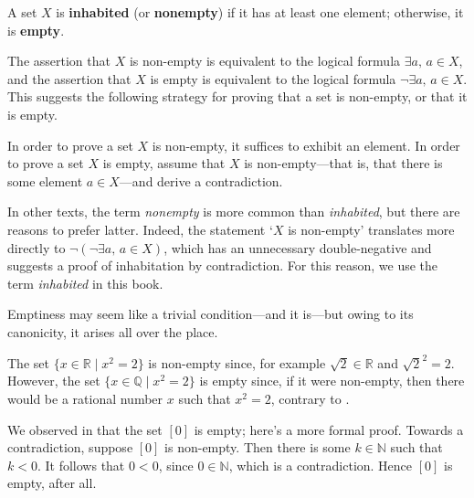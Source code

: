 \begin{definition}
\label{defInhabited}
\label{defEmptyProperty}
A set $X$ is \textbf{inhabited} (or \textbf{nonempty}) if it has at least one element; otherwise, it is \textbf{empty}.
\end{definition}

The assertion that $X$ is non-empty is equivalent to the logical formula $\exists a,\, a \in X$, and the assertion that $X$ is empty is equivalent to the logical formula $\neg \exists a,\, a \in X$. This suggests the following strategy for proving that a set is non-empty, or that it is empty.

\begin{strategy}
In order to prove a set $X$ is non-empty, it suffices to exhibit an element. In order to prove a set $X$ is empty, assume that $X$ is non-empty---that is, that there is some element $a \in X$---and derive a contradiction.
\end{strategy}

In other texts, the term \textit{nonempty} is more common than \textit{inhabited}, but there are reasons to prefer latter. Indeed, the statement `$X$ is non-empty' translates more directly to $\neg(\neg \exists a,\, a \in X)$, which has an unnecessary double-negative and suggests a proof of inhabitation by contradiction. For this reason, we use the term \textit{inhabited} in this book.

Emptiness may seem like a trivial condition---and it is---but owing to its canonicity, it arises all over the place.

\begin{example}
The set $\{ x \in \mathbb{R} \mid x^2 = 2 \}$ is non-empty since, for example $\sqrt{2} \in \mathbb{R}$ and $\sqrt{2}^2 = 2$. However, the set $\{ x \in \mathbb{Q} \mid x^2 = 2 \}$ is empty since, if it were non-empty, then there would be a rational number $x$ such that $x^2 = 2$, contrary to .
\end{example}

\begin{example}
We observed in  that the set $[0]$ is empty; here's a more formal proof. Towards a contradiction, suppose $[0]$ is non-empty. Then there is some $k \in \mathbb{N}$ such that $k < 0$. It follows that $0 < 0$, since $0 \in \mathbb{N}$, which is a contradiction. Hence $[0]$ is empty, after all.
\end{example}

